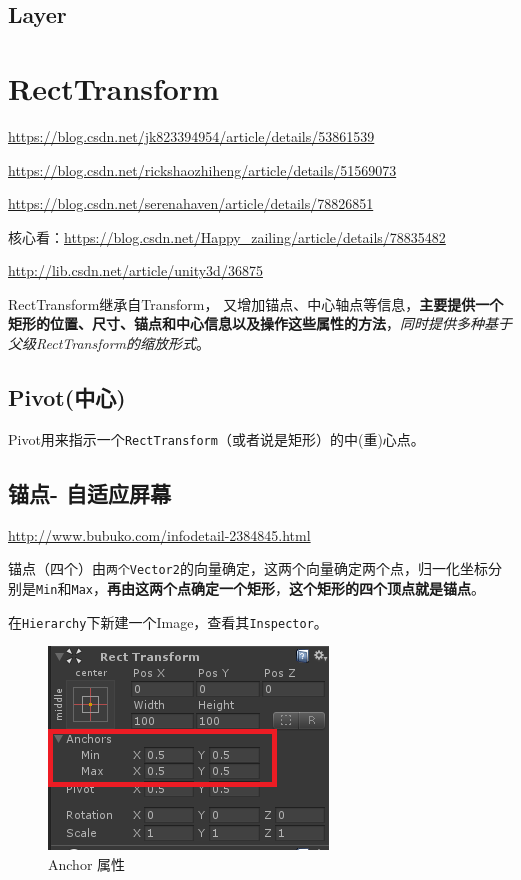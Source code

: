 \documentclass[UTF8,a4paper,12pt]{ctexbook}
\begin{document}
		\subsection{Layer}
		
		
	\section{RectTransform}
		\url{https://blog.csdn.net/jk823394954/article/details/53861539}
	
		\url{https://blog.csdn.net/rickshaozhiheng/article/details/51569073}
		
		\url{https://blog.csdn.net/serenahaven/article/details/78826851}
		
		核心看：\url{https://blog.csdn.net/Happy_zailing/article/details/78835482}
		
		\url{http://lib.csdn.net/article/unity3d/36875}
		
		RectTransform继承自Transform， 又增加锚点、中心轴点等信息，\textbf{主要提供一个矩形的位置、尺寸、锚点和中心信息以及操作这些属性的方法}，\textit{同时提供多种基于父级RectTransform的缩放形式}。
		
		\subsection{Pivot(中心)}
			Pivot用来指示一个\verb|RectTransform|（或者说是矩形）的中(重)心点。	
	
		\subsection{锚点- 自适应屏幕}
			\url{http://www.bubuko.com/infodetail-2384845.html}
			
			
			锚点（四个）由\verb|两个Vector2|的向量确定，这两个向量确定两个点，归一化坐标分别是\verb|Min|和\verb|Max|，\textbf{再由这两个点确定一个矩形}，\textbf{这个矩形的四个顶点就是锚点}。
			
			在\verb|Hierarchy|下新建一个Image，查看其\verb|Inspector|。
			
			\begin{figure}[H]
				\centering
				\includegraphics[scale=1.2]{Anchor.png}
				\caption{Anchor 属性}
			\end{figure}
			
\end{document}
